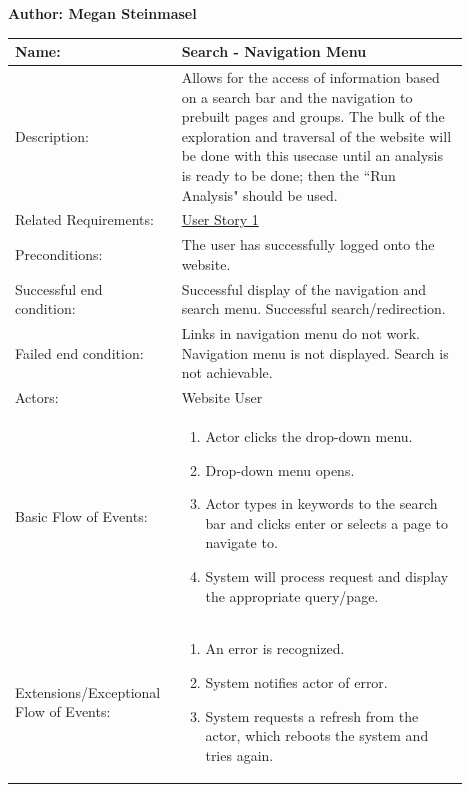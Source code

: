 \documentclass[11pt]{article}
\begin{document}
\begin{table}[!ht]
\begin{center}
\textbf{Author: Megan Steinmasel}
\vspace*{1em}

\begin{tabular}{p{0.30\linewidth}p{0.60\linewidth}}
	Name: & Search - Navigation Menu\\\hline
	Description: & Allows for the access of information based on a search bar and the navigation to prebuilt pages and groups. The bulk of the exploration and traversal of the website will be done with this usecase until an analysis is ready to be done; then the ``Run Analysis" should be used.\\\hline
	Related Requirements:& \hyperlink{us1}{User Story 1}\\\hline
	Preconditions:& The user has successfully logged onto the website.\\\hline
	Successful end condition:& Successful display of the navigation and search menu. Successful search/redirection.\\\hline
	Failed end condition:& Links in navigation menu do not work. Navigation menu is not displayed. Search is not achievable. \\\hline
	Actors:& Website User\\\hline
	Basic Flow of Events: & \begin{enumerate}
	\item Actor clicks the drop-down menu.
	\item Drop-down menu opens.
	\item Actor types in keywords to the search bar and clicks enter or selects a page to navigate to.
	\item System will process request and display the appropriate query/page.
	\end{enumerate}\\\hline
	Extensions/Exceptional Flow of Events: & \begin{enumerate}
	\item An error is recognized.
	\item System notifies actor of error.
	\item System requests a refresh from the actor, which reboots the system and tries again.
	\end{enumerate}
\end{tabular}
\label{des:search_nav_menu}	
\end{center}
\end{table}
\end{document}

